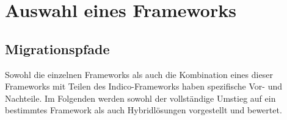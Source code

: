 \chapter{Auswahl eines Frameworks}

\section{Migrationspfade}
Sowohl die einzelnen Frameworks als auch die Kombination eines dieser Frameworks mit Teilen des
Indico-Frameworks haben spezifische Vor- und Nachteile. Im Folgenden werden sowohl der vollständige
Umstieg auf ein bestimmtes Framework als auch Hybridlösungen vorgestellt und bewertet.
